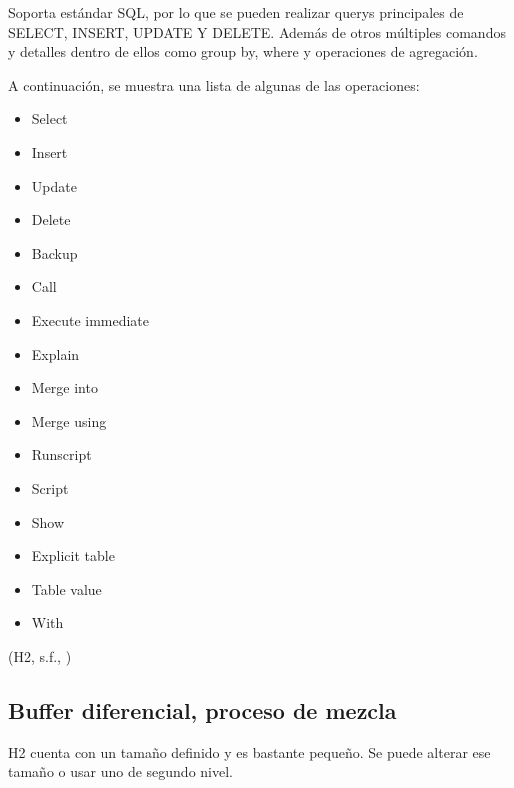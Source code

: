 \documentclass{acmart}
\begin{document}
Soporta estándar SQL, por lo que se pueden realizar querys principales de SELECT, INSERT, UPDATE Y DELETE.  Además de otros múltiples comandos y detalles dentro de ellos como group by, where y operaciones de agregación. 

A continuación, se muestra una lista de algunas de las operaciones:


\begin{itemize}

\item Select

\item Insert

\item Update

\item Delete

\item Backup

\item Call

\item Execute immediate

\item Explain

\item Merge into

\item Merge using

\item Runscript

\item Script

\item Show

\item Explicit table

\item Table value

\item With



\end{itemize}

(H2, s.f., \cite{h2commands})

\subsection{Buffer diferencial, proceso de mezcla}

H2 cuenta con un tamaño definido y es bastante pequeño. Se puede alterar ese tamaño o usar uno de segundo nivel.  
\end{document}
